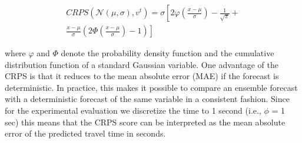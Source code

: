 \vspace{0.1cm}

\begin{multline}
CRPS(\mathcal{N}(\mu,\sigma), v^t) = \sigma \left[ 2\varphi\left(\frac{x -
\mu}{\sigma}\right) - \frac{1}{\sqrt{\pi}} + \right. \\ \left.\frac{x -
\mu}{\sigma}\left(2 \Phi\left(\frac{x - \mu}{\sigma}\right) - 1 \right) \right]
\end{multline}

\vspace{0.2cm}

where $\varphi$ and $\Phi$ denote the probability density function and the
cumulative distribution function of a standard Gaussian variable. One advantage
of the CRPS is that it reduces to the mean absolute error (MAE) if the forecast
is deterministic. In practice, this makes it possible to compare an
ensemble forecast with a deterministic forecast of the same variable in a
consistent fashion. Since for the experimental evaluation we discretize the time
to 1 second (i.e., $\phi$ = 1 sec) this means that the CRPS score can be
interpreted as the mean absolute error of the predicted travel time in seconds.

